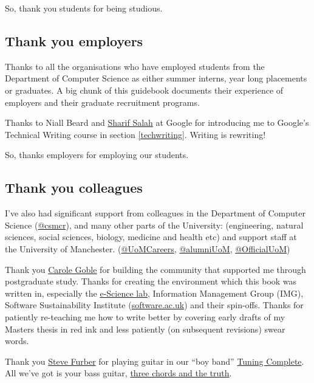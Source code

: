 \documentclass[
]{book}
\begin{document}
So, thank you students for being studious. 🙏

\hypertarget{employers}{%
\subsection{Thank you employers}\label{employers}}

Thanks to all the organisations who have employed students from the Department of Computer Science as either summer interns, year long placements or graduates. A big chunk of this guidebook documents their experience of employers and their graduate recruitment programs.

Thanks to Niall Beard and \href{https://github.com/sharifsalah}{Sharif Salah} at Google for introducing me to Google's Technical Writing course in section \ref{techwriting}. Writing is rewriting!

So, thanks employers for employing our students. 🙏

\hypertarget{colleagues}{%
\subsection{Thank you colleagues}\label{colleagues}}

I've also had significant support from colleagues in the Department of Computer Science (\href{https://twitter.com/csmcr}{@csmcr}), and many other parts of the University: (engineering, natural sciences, social sciences, biology, medicine and health etc) and support staff at the University of Manchester. (\href{https://twitter.com/UoMCareers}{@UoMCareers}, \href{https://twitter.com/alumniUoM}{@alumniUoM}, \href{https://twitter.com/OfficialUoM}{@OfficialUoM})

Thank you \href{https://en.wikipedia.org/wiki/Carole_Goble}{Carole Goble} for building the community that supported me through postgraduate study. Thanks for creating the environment which this book was written in, especially the \href{https://esciencelab.org.uk/}{e-Science lab}, Information Management Group (IMG), Software Sustainability Institute (\href{https://software.ac.uk/}{software.ac.uk}) and their spin-offs. Thanks for patiently re-teaching me how to write better by covering early drafts of my Masters thesis in red ink and less patiently (on subsequent revisions) swear words. 🤬

Thank you \href{https://en.wikipedia.org/wiki/Steve_Furber}{Steve Furber} for playing guitar in our ``boy band'' \href{https://personalpages.manchester.ac.uk/staff/duncan.hull/research\#tuningcomplete}{Tuning Complete}. All we've got is your bass guitar, \href{https://en.wikipedia.org/wiki/Three_Chords_and_the_Truth}{three chords and the truth}. \citep{harlan, allalongthewatchtower} 🎸
\end{document}
